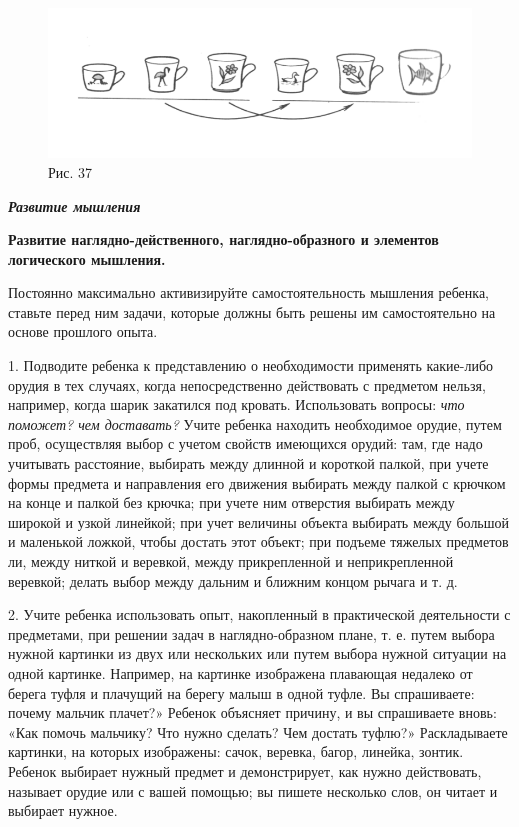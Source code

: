 \documentclass[a5paper]{book}
\renewcommand{\emph}[1]{\textit{#1}}
\begin{document}
\begin{figure}
\centering
\includegraphics[width=\linewidth]{media/media/image34.png}
\caption*{Рис. 37}
\end{figure}


\emph{\textbf{Развитие мышления}}

\textbf{Развитие наглядно-действенного, наглядно-образного и элементов
логического мышления.}

Постоянно максимально активизируйте самостоятельность мышления ребенка,
ставьте перед ним задачи, которые должны быть решены им самостоятельно
на основе прошлого опыта.

1. Подводите ребенка к представлению о необходимости применять
какие-либо орудия в тех случаях, когда непосредственно действовать с
предметом нельзя, например, когда шарик закатился под кровать.
Использовать вопросы: \emph{что поможет? чем доставать?} Учите ребенка
находить необходимое орудие, путем проб, осуществляя выбор с учетом
свойств имеющихся орудий: там, где надо учитывать расстояние, выбирать
между длинной и короткой палкой, при учете формы предмета и направления
его движения выбирать между палкой с крючком на конце и палкой без
крючка; при учете ним отверстия выбирать между широкой и узкой линейкой;
при учет величины объекта выбирать между большой и маленькой ложкой,
чтобы достать этот объект; при подъеме тяжелых предметов ли, между
ниткой и веревкой, между прикрепленной и неприкрепленной веревкой;
делать выбор между дальним и ближним концом рычага и т. д.

2. Учите ребенка использовать опыт, накопленный в практической
деятельности с предметами, при решении задач в наглядно-образном плане,
т. е. путем выбора нужной картинки из двух или нескольких или путем
выбора нужной ситуации на одной картинке. Например, на картинке
изображена плавающая недалеко от берега туфля и плачущий на берегу малыш
в одной туфле. Вы спрашиваете: почему мальчик плачет?» Ребенок объясняет
причину, и вы спрашиваете вновь: «Как помочь мальчику? Что нужно
сделать? Чем достать туфлю?» Раскладываете картинки, на которых
изображены: сачок, веревка, багор, линейка, зонтик. Ребенок выбирает
нужный предмет и демонстрирует, как нужно действовать, называет орудие
или с вашей помощью; вы пишете несколько слов, он читает и выбирает
нужное.
\end{document}

